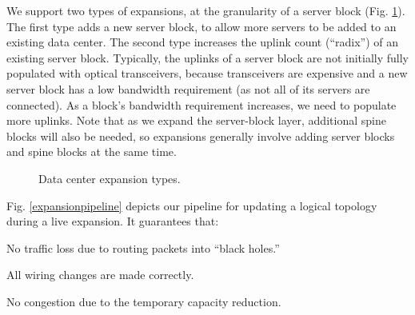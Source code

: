 \documentclass[letterpaper,twocolumn,10pt]{article}
\newenvironment{MYitemize}{\begin{list}{\labelitemi}{%
\setlength{\topsep}{0pt plus 0pt minus 0pt}%
\setlength{\itemsep}{0pt plus 0pt minus 0pt}%
\setlength{\parsep}{0pt plus 0pt minus 0pt}%
\setlength{\parskip}{0pt plus 0pt minus 0pt}%
\setlength{\leftmargin}{0.7em}%
\setlength{\listparindent}{1em}%
\setlength{\labelsep}{.25em}%
}}{\end{list}}
\begin{document}
We support two types of expansions, at the granularity of a server block (Fig. \ref{dcnexpansion}). The first type adds a new server block, to allow more servers to be added to an existing data center. The second type increases the uplink count (``radix'') of an existing server block. Typically, the uplinks of a server block are not initially fully populated with optical transceivers, because transceivers are expensive and a new server block has a low bandwidth requirement (as not all of its servers are connected). As a block's bandwidth requirement increases, we need to populate more uplinks. Note that as we expand the server-block layer, additional spine blocks will also be needed, so expansions generally involve adding server blocks and spine blocks at the same time.
\begin{figure}
 \centering
\vspace{-1ex}
 \caption{Data center expansion types.}\label{dcnexpansion}
\end{figure}

Fig. \ref{expansionpipeline} depicts our pipeline for updating a logical topology during a live expansion.   It guarantees that:
\begin{MYitemize}
  \item No traffic loss due to routing packets into ``black holes.'' 
  \item All wiring changes are made correctly.
  \item No congestion due to the temporary capacity reduction.
\end{MYitemize}
\end{document}
